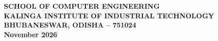 \documentclass[12pt, a4paper, oneside]{report}
\newcommand{\reportmonth}{November 2026}
\begin{document}
\begin{titlepage}
\begin{center}
{\begin{minipage}[c][\dimexpr\textheight-2\fboxsep-2\fboxrule\relax][c]{0.92\textwidth}
\begin{center}
{\normalsize \textbf{SCHOOL OF COMPUTER ENGINEERING}}\\[6pt]
{\large \textbf{KALINGA INSTITUTE OF INDUSTRIAL TECHNOLOGY}}\\[6pt]
{\normalsize \textbf{BHUBANESWAR, ODISHA -- 751024}}\\[8pt]
{\normalsize \textbf{\reportmonth}}

\vspace{1cm}

\end{center}
\end{minipage}}

\end{center}
\end{titlepage}

\newpage
\thispagestyle{empty}
\end{document}
